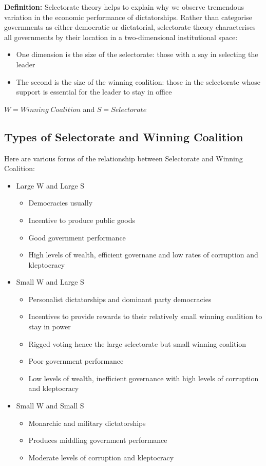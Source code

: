 \documentclass[12pt, letterpaper]{article}
\begin{document}
\textbf{Definition:} Selectorate theory helps to explain why we observe tremendous variation in the economic performance of dictatorships. Rather than categorise governments as either democratic or dictatorial, selectorate theory characterises all governments by their location in a two-dimensional institutional space:
\begin{itemize}
	\item One dimension is the size of the selectorate: those with a say in selecting the leader
	\item The second is the size of the winning coalition: those in the selectorate whose support is essential for the leader to stay in office
\end{itemize}

\begin{center}
	$W = Winning\;Coalition$ and $S = Selectorate$
\end{center}

\subsection{Types of Selectorate and Winning Coalition}
Here are various forms of the relationship between Selectorate and Winning Coalition:
\begin{itemize}
	\item Large W and Large S
		\begin{itemize}
			\item Democracies usually
			\item Incentive to produce public goods
			\item Good government performance
			\item High levels of wealth, efficient governane and low rates of corruption and kleptocracy
		\end{itemize}
	\item Small W and Large S
		\begin{itemize}
			\item Personalist dictatorships and dominant party democracies
			\item Incentives to provide rewards to their relatively small winning coalition to stay in power
			\item Rigged voting hence the large selectorate but small winning coalition
			\item Poor government performance
			\item Low levels of wealth, inefficient governance with high levels of corruption and kleptocracy
		\end{itemize}
	\item Small W and Small S
		\begin{itemize}
			\item Monarchic and military dictatorships
			\item Produces middling government performance
			\item Moderate levels of corruption and kleptocracy
		\end{itemize}
\end{itemize}
\end{document}
